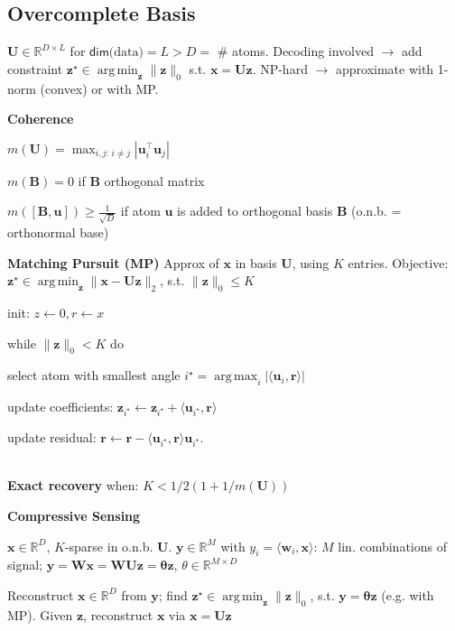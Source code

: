 \documentclass[a4paper, 11pt, landscape]{article}
\newenvironment{inlinelist}%
{\begin{enumerate*}[label=\textbf{\color{red}\theenumi.}]}%
{\end{enumerate*}}
\DeclareMathOperator*{\argmin}{arg\,min}
\DeclareMathOperator*{\argmax}{arg\,max}
\begin{document}
\begin{multicols*}{3}
\subsection{Overcomplete Basis}
$\mathbf{U} \in \mathbb{R}^{D \times  L}$ for $\mathsf{dim}\text{(data)} = L > D =$ \# atoms. Decoding involved $\rightarrow$ add constraint $\mathbf{z}^\star \in \argmin_\mathbf{z} \lVert \mathbf{z} \rVert_0$ s.t. $\mathbf{x} = \mathbf{Uz}$. NP-hard $\rightarrow$ approximate with 1-norm (convex) or with MP.

\textbf{Coherence}
\begin{inparaitem}[\color{red}\textbullet]
	\item $m(\mathbf{U}) = \max_{i,j:\, i \neq j} | \mathbf{u}_i^\top \mathbf{u}_j |$
	\item $m(\mathbf{B}) = 0$ if $\mathbf{B}$ orthogonal matrix
	\item $m([\mathbf{B}, \mathbf{u}]) \geq \frac{1}{\sqrt{D}}$ if atom $\mathbf{u}$ is added to orthogonal basis $\mathbf{B}$ (o.n.b. = orthonormal base)
\end{inparaitem}

\textbf{Matching Pursuit (MP)}
Approx of $\mathbf{x}$ in basis $\mathbf{U}$, using $K$ entries.
Objective: $\mathbf{z}^\star \in \argmin_{\mathbf{z}} \|\mathbf{x} - \mathbf{Uz} \|_2$, s.t. $\|\mathbf{z}\|_0 \leq K$
\begin{inlinelist}
	\item init: $z \leftarrow 0, r \leftarrow x$
	\item while $\|\mathbf{z}\|_0 < K$ do
	\item select atom with smallest angle $i^\star = \argmax_i |\langle \mathbf{u}_i, \mathbf{r} \rangle|$
	\item update coefficients: $\mathbf{z}_{i^\star} \leftarrow \mathbf{z}_{i^\star} + \langle \mathbf{u}_{i^\star}, \mathbf{r} \rangle$
	\item update residual: $\mathbf{r} \leftarrow \mathbf{r} - \langle \mathbf{u}_{i^\star}, \mathbf{r} \rangle \mathbf{u}_{i^\star}$.
\end{inlinelist}
\\\textbf{Exact recovery} when: $K<1/2( 1+1/m(\mathbf{U}))$

\textbf{Compressive Sensing}
\begin{inparaitem}[\color{red}\textbullet]
  \item $\mathbf{x} \in \mathbb{R}^D$, $K$-sparse in o.n.b. $\mathbf{U}$. $\mathbf{y} \in \mathbb{R}^M$ with $y_i = \langle \mathbf{w}_i, \mathbf{x}\rangle $: $M$ lin. combinations of signal; $\mathbf{y} = \mathbf{Wx} = \mathbf{WUz} = \mathbf{\theta z}$, $\theta \in \mathbb{R}^{M \times D}$
  \item Reconstruct $\mathbf{x} \in \mathbb{R}^D$ from $\mathbf{y}$; find $\mathbf{z}^\star \in \argmin_{\mathbf{z}}\|\mathbf{z}\|_0$, s.t. $\mathbf{y} = \mathbf{\theta z}$ (e.g. with MP). Given $\mathbf{z}$, reconstruct $\mathbf{x}$ via $\mathbf{x} = \mathbf{Uz}$
\end{inparaitem}


\end{multicols*}
\end{document}
